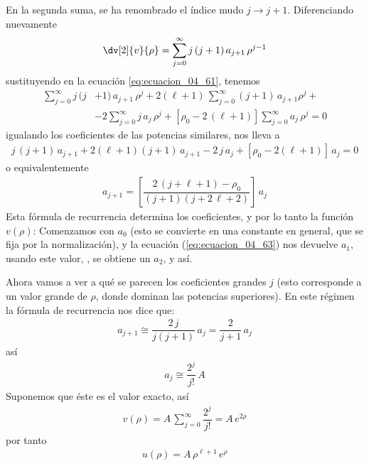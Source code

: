 En la segunda suma, se ha renombrado el índice mudo $j \to j + 1$. Diferenciando nuevamente
\begin{align*}
\dv[2]{v}{\rho} = \sum_{j=0}^{\infty} j \, (j+1) \, a_{j+1} \, \rho^{j-1}
\end{align*}
sustituyendo en la ecuación \ref{eq:ecuacion_04_61}, tenemos
\begin{align*}
\sum_{j=0}^{\infty} j \, (j &+ 1) \, a_{j+1} \, \rho^{j} + 2 (\ell + 1) \, \sum_{j=0}^{\infty} (j + 1) \, a_{j+1} \rho^{j} + \\[0.5em]
&- 2 \sum_{j=0}^{\infty} j \, a_{j} \, \rho^{j} + [ \rho_{0} - 2 \, (\ell + 1)] \sum_{j=0}^{\infty} a_{j} \, \rho^{j} = 0
\end{align*}
igualando los coeficientes de las potencias similares, nos lleva a
\begin{align*}
j \, (j + 1) \, a_{j+1} + 2(\ell + 1)(j + 1) \, a_{j+1} - 2 \, j \, a_{j} + [\rho_{0} - 2(\ell + 1)] \, a_{j} = 0
\end{align*}
o equivalentemente
\begin{align}
a_{j+1} = \left[ \dfrac{2 \, (j + \ell + 1) - \rho_{0}}{(j + 1)(j + 2 \, \ell + 2)} \right] \, a_{j}
\label{eq:ecuacion_04_63}
\end{align}
Esta fórmula de recurrencia determina los coeficientes, y por lo tanto la función $v(\rho)$: Comenzamos con $a_{0}$ (esto se convierte en una constante en general, que se fija por la normalización), y la ecuación (\ref{eq:ecuacion_04_63}) nos devuelve $a_{1}$, usando este valor, , se obtiene un $a_{2}$, y así.
\par
Ahora vamos a ver a qué se parecen los coeficientes grandes $j$ (esto corresponde a un valor grande de $\rho$, donde dominan las potencias superiores). En este régimen la fórmula de recurrencia nos dice que:
\begin{align*}
a_{j+1} \cong \dfrac{2 \, j}{j (j + 1)} \, a_{j} =  \dfrac{2}{j + 1} \, a_{j}
\end{align*}
así
\begin{align}
a_{j} \cong \dfrac{2^{j}}{j!} \, A
\label{eq:ecuacion_04_64}
\end{align}
Suponemos que éste es el valor exacto, así
\begin{align*}
v(\rho) = A \, \sum_{j=0}^{\infty} \dfrac{2^{j}}{j!} =  A \, e^{2 \rho}
\end{align*}
por tanto
\begin{align}
u(\rho) = A \, \rho^{\ell + 1} \, e^{\rho}
\label{eq:ecuacion_04_65}
\end{align}
